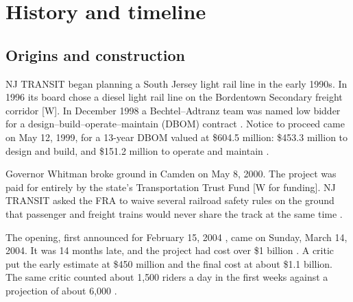 \documentclass[11pt]{article}
\newcommand{\flag}[1]{\textcolor{sb}{\textsf{[#1]}}}
\begin{document}
\section{History and timeline}\label{sec:history}
\subsection{Origins and construction}
NJ TRANSIT began planning a South Jersey light rail line in the early 1990s. In 1996 its board chose a diesel light rail line on the Bordentown Secondary freight corridor \flag{W}. In December 1998 a Bechtel--Adtranz team was named low bidder for a design--build--operate--maintain (DBOM) contract \citep{bechtel1998}. Notice to proceed came on May 12, 1999, for a 13-year DBOM valued at \$604.5 million: \$453.3 million to design and build, and \$151.2 million to operate and maintain \citep{njdot2000groundbreaking}.

Governor Whitman broke ground in Camden on May 8, 2000. The project was paid for entirely by the state's Transportation Trust Fund \citep{njdot2000groundbreaking} \flag{W for funding}. NJ TRANSIT asked the FRA to waive several railroad safety rules on the ground that passenger and freight trains would never share the track at the same time \citep{fr1999waiver}.

The opening, first announced for February 15, 2004 \citep{njt2003debut}, came on Sunday, March 14, 2004. It was 14 months late, and the project had cost over \$1 billion \citep{camdenhistory2004}. A critic put the early estimate at \$450 million and the final cost at about \$1.1 billion. The same critic counted about 1{,}500 riders a day in the first weeks against a projection of about 6{,}000 \citep{reason2004}.
\end{document}
